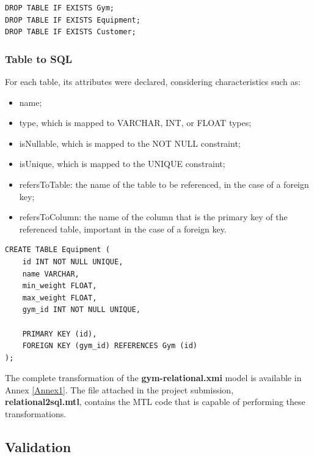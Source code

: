 \documentclass[10pt]{article}
\begin{document}
\begin{lstlisting}
DROP TABLE IF EXISTS Gym;
DROP TABLE IF EXISTS Equipment;
DROP TABLE IF EXISTS Customer;
\end{lstlisting}

\subsubsection{Table to SQL}

For each table, its attributes were declared, considering characteristics such as:

\begin{itemize}

    \item name;
    
    \item type, which is mapped to VARCHAR, INT, or FLOAT types;
    
    \item isNullable, which is mapped to the NOT NULL constraint;
    
    \item isUnique, which is mapped to the UNIQUE constraint;
    
    \item refersToTable: the name of the table to be referenced, in the case of a foreign key;
    
    \item refersToColumn: the name of the column that is the primary key of the referenced table, important in the case of a foreign key.

\end{itemize}

\begin{lstlisting}
CREATE TABLE Equipment (
	id INT NOT NULL UNIQUE,
	name VARCHAR,
	min_weight FLOAT,
	max_weight FLOAT,
	gym_id INT NOT NULL UNIQUE,
	
	PRIMARY KEY (id),
	FOREIGN KEY (gym_id) REFERENCES Gym (id)
);
\end{lstlisting}

The complete transformation of the \textbf{gym-relational.xmi} model is available in Annex \ref{Annex1}. The file attached in the project submission, \textbf{relational2sql.mtl}, contains the MTL code that is capable of performing these transformations.

\subsection{Validation}
\end{document}
